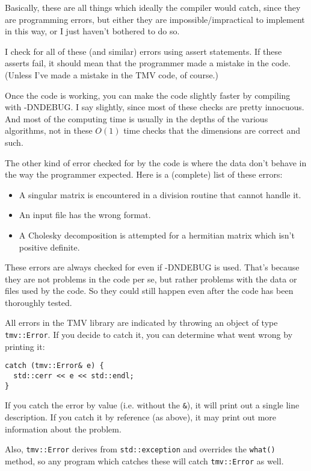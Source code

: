 \documentclass[twoside,letterpaper,11pt]{article}
\renewcommand{\tt}[1]{{\texttt {#1}}}
\begin{document}
Basically, these are all things which ideally the compiler would catch, since they 
are programming errors, but either they are impossible/impractical to implement
in this way, or I just haven't bothered to do so.

I check for all of these (and similar) errors using assert statements.
If these asserts fail, it should mean that
the programmer made a mistake in the code.  (Unless I've made a 
mistake in the TMV code, of course.)

Once the code is working, you can make the code slightly faster by 
compiling with -DNDEBUG.  I say slightly, since most of these checks 
are pretty innocuous.  And most of the computing time is usually in the depths
of the various algorithms, not in these $O(1)$ time checks that the dimensions
are correct and such.  

The other kind of error checked for by the code is 
where the data don't behave in the way
the programmer expected.  Here is a (complete) list of these errors:
\begin{itemize}
\item
A singular matrix is encountered in a division routine that cannot handle it.
\item
An input file has the wrong format.
\item
A Cholesky decomposition is attempted for a
hermitian matrix which isn't positive definite.
\end{itemize}

These errors are always checked for even if -DNDEBUG is used.
That's because they are not problems in the code per se, but rather
problems with the data or files used by the code.  So they could
still happen even after the code has been thoroughly tested.

All errors in the TMV library are indicated by throwing an object of type
\tt{tmv::Error}.  If you decide to catch it, you can determine what went
wrong by printing it:
\begin{verbatim}
catch (tmv::Error& e) {
  std::cerr << e << std::endl;
}
\end{verbatim}
If you catch the error by value (i.e. without the \tt{\&}), it will print out
a single line description.  If you catch it by reference (as above), it may 
print out more information about the problem.

Also, \tt{tmv::Error} derives from \tt{std::exception} and overrides the \tt{what()}
method, so any program which catches these will catch \tt{tmv::Error} as well.
\end{document}
